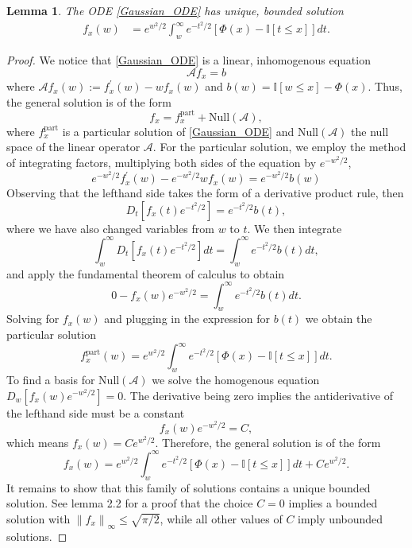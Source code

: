 \documentclass[12pt]{article}
\newcommand{\indicator}[1]{\mathbb{I}[#1]}
\newcommand*{\norm}[1]{\left\lVert#1\right\rVert}
\newcommand{\GaussianCDF}{\Phi}
\newcommand{\steinOperator}{\mathcal{A}}
\newtheorem{lemma}{Lemma}
\begin{document}
\begin{lemma} \label{Gaussian_ODE_lemma}
The ODE \ref{Gaussian_ODE} has unique, bounded solution 
\begin{align}
f_x(w) &= e^{w^2/2} \int_{w}^{\infty} e^{-t^2/2} \left[\GaussianCDF(x) - \indicator{t \leq x} \right] dt.
\end{align}
\end{lemma}

\begin{proof} 
We notice that \ref{Gaussian_ODE} is a linear, inhomogenous equation
\[\steinOperator f_x = b\]
where $\steinOperator f_x(w) := f_x^\prime(w) - w f_x(w)$ and $b(w) = \indicator{w \leq x} - \GaussianCDF(x)$. 
Thus, the general solution is of the form 
\[f_x = f_x^{\text{part}} + \text{Null}(\steinOperator),\]
where $f_x^{\text{part}}$ is a particular solution of \ref{Gaussian_ODE} and $\text{Null}(\steinOperator)$ the null space of the linear operator $\steinOperator$. 
For the particular solution, we employ the method of integrating factors, multiplying both sides of the equation by $e^{-w^2/2}$,
\[
e^{-w^2/2} f_x^\prime(w) - e^{-w^2/2} wf_x(w) = e^{-w^2/2} b(w)
\]
Observing that the lefthand side takes the form of a derivative product rule, then 
\[
D_{t} \left[f_x(t) e^{-t^2/2} \right] = e^{-t^2/2} b(t),
\] 
where we have also changed variables from $w$ to $t$. We then integrate 
\[
\int_{w}^{\infty} D_{t} \left[f_x(t) e^{-t^2/2} \right] dt = \int_{w}^{\infty} e^{-t^2/2} b(t) dt,
\]
and apply the fundamental theorem of calculus to obtain 
\[
0 - f_x(w) e^{-w^2/2} = \int_{w}^{\infty} e^{-t^2/2} b(t) dt.
\]
Solving for $f_x(w)$ and plugging in the expression for $b(t)$ we obtain the particular solution 
\[
f_x^{\text{part}}(w) = e^{w^2/2} \int_{w}^{\infty} e^{-t^2/2} \left[\GaussianCDF(x) - \indicator{t \leq x}\right] dt.
\]
To find a basis for $\text{Null}(\steinOperator)$ we solve the homogenous equation $D_{w} \left[f_x(w) e^{-w^2/2} \right] = 0$. The derivative being zero implies the 
antiderivative of the lefthand side must be a constant 
\[
f_x(w) e^{-w^2/2} = C,
\]
which means $f_x(w) = C e^{w^2/2}$. Therefore, the general solution is of the form 
\[
f_x(w) = e^{w^2/2} \int_{w}^{\infty} e^{-t^2/2} \left[\GaussianCDF(x) - \indicator{t \leq x}\right] dt + C e^{w^2/2}.
\]
It remains to show that this family of solutions contains a unique bounded solution. See \cite{Ross} lemma 2.2 for a proof that the choice $C = 0$ implies 
a bounded solution with $\norm{f_x}_{\infty} \leq \sqrt{\pi/2}$, while all other values of $C$ imply unbounded solutions. 
\end{proof}
\end{document}

